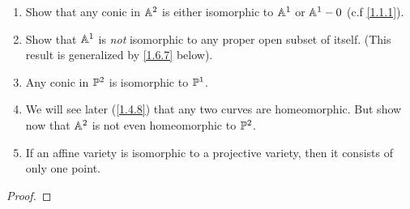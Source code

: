 \label{1.3.1}

\begin{enumerate}[label = (\alph*)]
    \item Show that any conic in $\A^2$ is either isomorphic to $\A^1$ or $\A^1 - 0$ (c.f \ref{1.1.1}).

    \item Show that $\A^1$ is \emph{not} isomorphic to any proper open subset of itself. (This result is generalized by \ref{1.6.7} below).

    \item Any conic in $\P^2$ is isomorphic to $\P^1$.

    \item We will see later (\ref{1.4.8}) that any two curves are homeomorphic. But show now that $\A^2$ is not even homeomorphic to $\P^2$.

    \item If an affine variety is isomorphic to a projective variety, then it consists of only one point.
\end{enumerate}

\begin{proof}

\end{proof}
